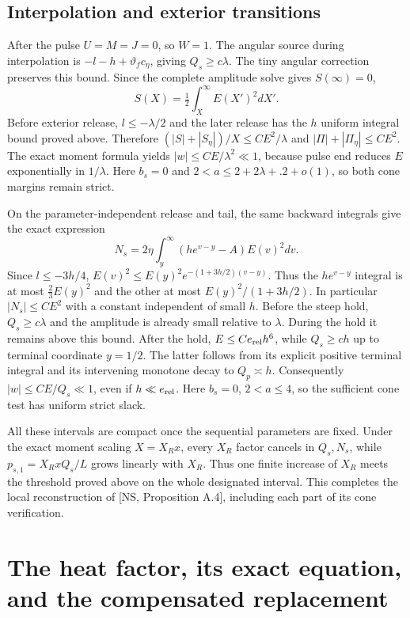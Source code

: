 \documentclass[10pt,a4paper]{article}
\begin{document}
\subsection{Interpolation and exterior transitions}
After the pulse $U=M=J=0$, so $W=1$.
The angular source during interpolation is $-l-h+\vartheta_fc_\eta$,
giving $Q_s\ge c\lambda$. The tiny angular correction preserves this bound.
Since the complete amplitude solve gives $S(\infty)=0$,
\[
S(X)=\tfrac12\int_X^\infty E(X')^2dX'.
\]
Before exterior release, $l\le-\lambda/2$ and the later release has the
$h$ uniform integral bound proved above. Therefore
$(|S|+|S_\eta|)/X\le CE^2/\lambda$ and
$|\Pi|+|\Pi_\eta|\le CE^2$. The exact moment formula yields
$|w|\le CE/\lambda^2\ll1$, because pulse end reduces $E$ exponentially
in $1/\lambda$. Here $b_s=0$ and $2<a\le2+2\lambda+.2+o(1)$,
so both cone margins remain strict.

On the parameter-independent release and tail, the same backward integrals
give the exact expression
\[
N_s=2\eta\int_y^\infty(he^{v-y}-A)E(v)^2dv.
\]
Since $l\le-3h/4$,
$E(v)^2\le E(y)^2e^{-(1+3h/2)(v-y)}$.
Thus the $he^{v-y}$ integral is at most $\tfrac23E(y)^2$ and the
other at most $E(y)^2/(1+3h/2)$. In particular $|N_s|\le CE^2$
with a constant independent of small $h$.
Before the steep hold, $Q_s\ge c\lambda$ and the amplitude is already
small relative to $\lambda$. During the hold it remains above this bound.
After the hold, $E\le Ce_{\rm rel}h^6$, while $Q_s\ge ch$ up to terminal
coordinate $y=1/2$. The latter follows from its explicit positive terminal
integral and its intervening monotone decay to $Q_p\asymp h$.
Consequently $|w|\le CE/Q_s\ll1$, even if $h\ll e_{\rm rel}$.
Here $b_s=0$, $2<a\le4$, so the sufficient cone test has uniform strict slack.

All these intervals are compact once the sequential parameters are fixed.
Under the exact moment scaling $X=X_Rx$, every $X_R$ factor cancels in
$Q_s,N_s$, while $p_{s,1}=X_RxQ_s/L$ grows linearly with $X_R$.
Thus one finite increase of $X_R$ meets the threshold proved above on the
whole designated interval. This completes the local reconstruction of
[NS, Proposition A.4], including each part of its cone verification.

\section{The heat factor, its exact equation, and the compensated replacement}
\end{document}
